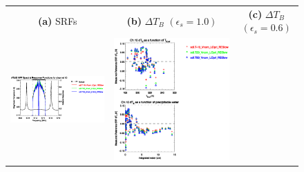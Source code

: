 \begin{figure}[H]
  \centering
  \begin{tabular}{c c c}
    \textsf{\textbf{(a)} SRFs} &
    \textsf{\textbf{(b)} $\Delta T_B$ $(\epsilon_s = 1.0)$} &
    \textsf{\textbf{(c)} $\Delta T_B$ $(\epsilon_s = 0.6)$} \\
    \includegraphics[bb=80 400 280 558,clip,scale=0.85]{graphics/srf/Tset/atms_npp.ch10.osrf.eps} &
    \includegraphics[bb=85 400 260 558,clip,scale=0.85]{graphics/dtb/Tset/e1.0_r0.0/atms_npp.ch10.dTb.eps} & 

\end{tabular}
\end{figure}
